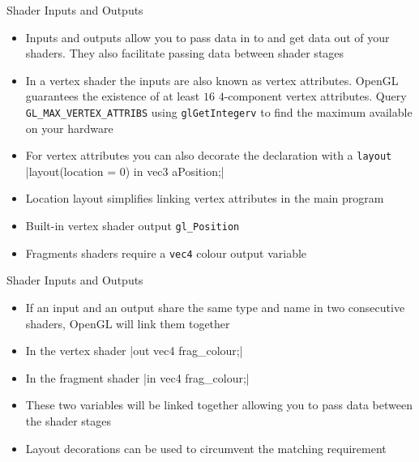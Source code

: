 \documentclass{beamer}
\begin{document}
\begin{frame}[fragile]{Shader Inputs and Outputs}
    \begin{itemize}
        \item Inputs and outputs allow you to pass data in to and get data out of your shaders. They also facilitate
            passing data between shader stages
        \item In a vertex shader the inputs are also known as vertex attributes. OpenGL guarantees the existence of at
            least $16$ $4$-component vertex attributes. Query {\color{blue}\verb"GL_MAX_VERTEX_ATTRIBS"} using
            {\color{blue}\verb"glGetIntegerv"} to find the maximum available on your hardware
        \item For vertex attributes you can also decorate the declaration with a {\color{blue}\verb"layout"}
            |layout(location = 0) in vec3 aPosition;|
        \item Location layout simplifies linking vertex attributes in the main program
        \item Built-in vertex shader output {\color{blue}\verb"gl_Position"}
        \item Fragments shaders require a {\color{blue}\verb"vec4"} colour output variable
    \end{itemize}
\end{frame}

\begin{frame}[fragile]{Shader Inputs and Outputs}
    \begin{itemize}
        \item If an input and an output share the same type and name in two consecutive shaders, OpenGL will link them
            together
        \item In the vertex shader |out vec4 frag_colour;|
        \item In the fragment shader |in vec4 frag_colour;|
        \item These two variables will be linked together allowing you to pass data between the shader stages
        \item Layout decorations can be used to circumvent the matching requirement
    \end{itemize}
\end{frame}
\end{document}
